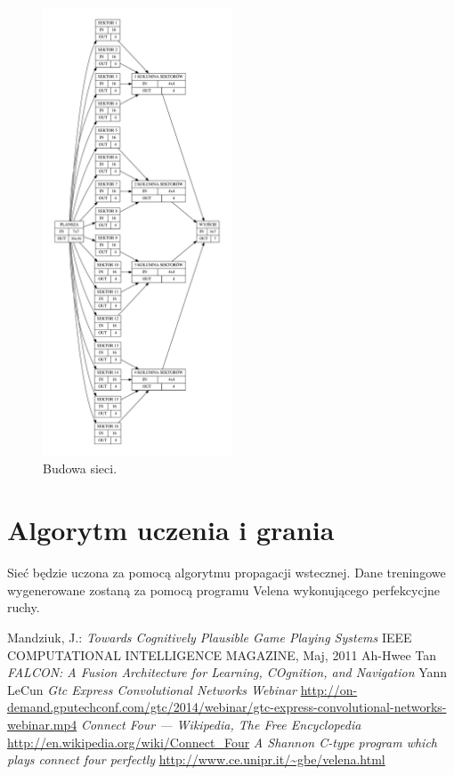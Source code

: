\documentclass{llncs}
\begin{document}
\begin{figure}
	\centering	
	\includegraphics[width=0.5\textwidth]{img/opis_sieci.pdf}	\caption{Budowa sieci.}
	\label{fig:Siec}
\end{figure}

\section{Algorytm uczenia i grania}
Sieć będzie uczona za pomocą algorytmu propagacji wstecznej. Dane treningowe wygenerowane zostaną za pomocą programu Velena\cite{velena} wykonującego perfekcycjne ruchy.

%
%
\begin{thebibliography}{4}
%
Mandziuk, J.:
\textsl{Towards Cognitively Plausible Game Playing Systems}
IEEE COMPUTATIONAL INTELLIGENCE MAGAZINE, Maj, 2011
Ah-Hwee Tan
\textsl{FALCON: A Fusion Architecture for Learning, COgnition, and Navigation}
Yann LeCun
\textsl{Gtc Express Convolutional Networks Webinar}
\url{http://on-demand.gputechconf.com/gtc/2014/webinar/gtc-express-convolutional-networks-webinar.mp4}
\textsl{Connect Four --- {W}ikipedia{,} The Free Encyclopedia}
\url{http://en.wikipedia.org/wiki/Connect_Four}
\textsl{A Shannon C-type program which plays connect four perfectly}
\url{http://www.ce.unipr.it/~gbe/velena.html}
\end{thebibliography}
\end{document}
